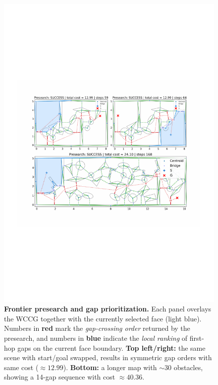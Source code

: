 \begin{figure}[t]
  \centering
  \includegraphics[width=\linewidth]{figures/presearch.pdf}%
  \vspace{-2mm}
  \caption{
  \textbf{Frontier presearch and gap prioritization.}
  Each panel overlays the WCCG together with the currently selected face (light blue). 
  Numbers in \textbf{red} mark the \emph{gap-crossing order} returned by the presearch, 
  and numbers in \textbf{blue} indicate the \emph{local ranking} of first-hop gaps on the current face boundary.
  \textbf{Top left/right:} the same scene with start/goal swapped, results in symmetric gap orders with same cost (\(\approx 12.99\)).
  \textbf{Bottom:} a longer map with \(\sim 30\) obstacles, showing a 14-gap sequence with cost \(\approx 40.36\).
  }
  \label{fig:presearch}
  \vspace{-3mm}
\end{figure}
